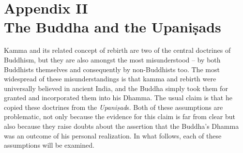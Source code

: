\label{footprints_split_019.html_calibre_pb_39}

\label{footprints_split_020.html}{}

\section{\texorpdfstring{{Appendix II}\\
The Buddha and the
Upaniṣads}{Appendix II The Buddha and the Upaniṣads}}\label{footprints_split_020.html_TOCTarget999-2}

Kamma and its related concept of rebirth are two of the central
doctrines of Buddhism, but they are also amongst the most misunderstood
-- by both Buddhists themselves and consequently by non-Buddhists too.
The most widespread of these misunderstandings is that kamma and rebirth
were universally believed in ancient India, and the Buddha simply took
them for granted and incorporated them into his Dhamma. The usual claim
is that he copied these doctrines from the \emph{Upaniṣad}s. Both of
these assumptions are problematic, not only because the evidence for
this claim is far from clear but also because they raise doubts about
the assertion that the Buddha's Dhamma was an outcome of his personal
realization. In what follows, each of these assumptions will be
examined.

